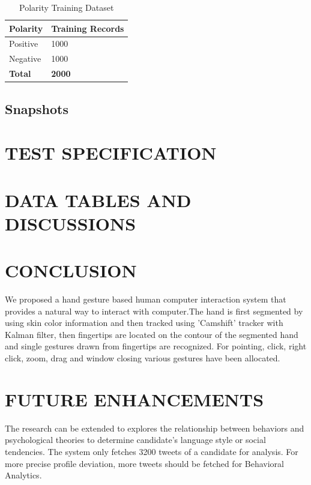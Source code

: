 \documentclass[oneside,a4paper,12pt]{pictreport}
\begin{document}
\renewcommand{\arraystretch}{1.5}

\begin{table}[h!]
\centering
\caption{Polarity Training Dataset}
\label{my-label}
\begin{tabular}{|l|l|}
\hline
\textbf{Polarity} & \textbf{Training Records} \\ \hline
Positive          & 1000                      \\ \hline
Negative          & 1000                      \\ \hline

\textbf{Total}    & \textbf{2000}             \\ \hline
\end{tabular}
\end{table}


\section{Snapshots}

\chapter{TEST SPECIFICATION}

\chapter{DATA TABLES AND DISCUSSIONS} 


\chapter{CONCLUSION}
We proposed a hand gesture based human computer
interaction system that provides a  natural  way to interact with computer.The hand 
is first segmented  by using skin color information and then tracked using 'Camshift'
tracker with Kalman filter, then fingertips are located on the contour of the segmented hand
and single gestures drawn from fingertips are recognized. For  pointing, click, right click, 
zoom, drag and window closing various gestures have been allocated.

\chapter{FUTURE ENHANCEMENTS} 
The research can be extended to explores the relationship between behaviors and 
psychological theories to determine candidate's language style or social tendencies.
The system only fetches 3200 tweets of a candidate for analysis. For more precise 
profile deviation, more tweets should be fetched for Behavioral Analytics. 
\end{document}
